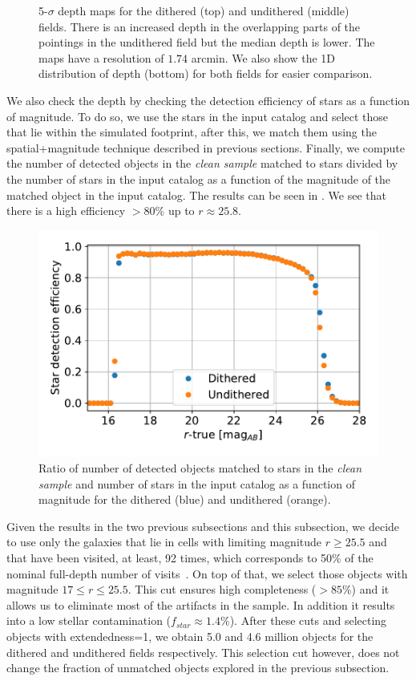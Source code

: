 \documentclass[twocolumn]{aastex62}
\begin{document}
\begin{figure}
\caption{5-$\sigma$ depth maps for the dithered (top) and undithered (middle) fields. There is an increased depth in the overlapping parts of the pointings in the undithered field but the median depth is lower. The maps have a resolution of $1.74$ arcmin. We also show the 1D distribution of depth (bottom) for both fields for easier comparison.}
\label{fig:depth_maps}
\end{figure}

We also check the depth by checking the detection efficiency of stars as a function of magnitude. To do so, we use the stars in the input catalog and select those that lie within the simulated footprint, after this, we match them using the spatial+magnitude technique described in previous sections. Finally, we compute the number of detected objects in the \textit{clean sample} matched to stars divided by the number of stars in the input catalog as a function of the magnitude of the matched object in the input catalog. The results can be seen in . We see that there is a high efficiency $> 80\%$ up to $r \approx 25.8$. 
\begin{figure}
\centering
\includegraphics[width=0.9\columnwidth]{stellar_detection_efficiency.pdf}
\caption{Ratio of number of detected objects matched to stars in the \textit{clean sample} and number of stars in the input catalog as a function of magnitude for the dithered (blue) and undithered (orange).}
\label{fig:stellar_detection_efficiency}
\end{figure}

Given the results in the two previous subsections and this subsection, we decide to use only the galaxies that lie in cells with limiting magnitude $r \geq 25.5$ and that have been visited, at least, 92 times, which corresponds to 50\% of the nominal full-depth number of visits~\citep{Overview}. On top of that, we select those objects with magnitude $17 \leq r \leq 25.5$. This cut ensures high completeness ($>85\%$) and it allows us to eliminate most of the artifacts in the sample. In addition it results into a low stellar contamination ($f_{star} \approx 1.4\%$). After these cuts and selecting objects with extendedness=1, we obtain 5.0 and 4.6 million objects for the dithered and undithered fields respectively. This selection cut however, does not change the fraction of unmatched objects explored in the previous subsection.
\end{document}
